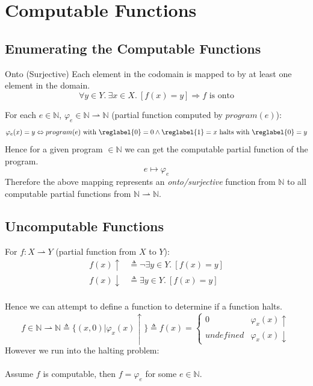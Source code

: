 \section{Computable Functions}
\subsection{Enumerating the Computable Functions}
\begin{definitionbox}{Onto (Surjective)}
    Each element in the codomain is mapped to by at least one element in the domain.
    \[\forall y \in Y. \  \exists x \in X. \  [f(x) = y] \Rightarrow f \text{ is onto}\]
\end{definitionbox}

For each $e \in \mathbb{N}$, $\varphi_e \in \mathbb{N} \rightharpoonup \mathbb{N}$ (partial function computed by $program(e)$):
\[\varphi_e(x) = y \Leftrightarrow program(e) \text{ with } \reglabel{0} = 0 \land \reglabel{1} = x \text{ halts with } \reglabel{0} = y\]
Hence for a given program $\in \mathbb{N}$ we can get the computable partial function of the program.
\[e \mapsto \varphi_e\]
Therefore the above mapping represents an \textit{onto/surjective} function from $\mathbb{N}$ to all computable partial functions from $\mathbb{N} \rightharpoonup \mathbb{N}$.

\subsection{Uncomputable Functions}
For $f: X \rightharpoonup Y$ (partial function from $X$ to $Y$):
\[\begin{split}
        f(x)\uparrow & \triangleq \neg \exists y \in Y . \ [f(x) = y] \\
        f(x)\downarrow & \triangleq  \exists y \in Y . \ [f(x) = y] \\
    \end{split}\]

Hence we can attempt to define a function to determine if a function halts.
\[f \in \mathbb{N} \rightharpoonup \mathbb{N} \triangleq \{(x,0) | \varphi_x(x)\uparrow\} \triangleq f(x) = \begin{cases}
		0         & \varphi_x(x)\uparrow   \\
		undefined & \varphi_x(x)\downarrow
	\end{cases}\]
However we run into the halting problem:
\\
\\ Assume $f$ is computable, then $f = \varphi_e$ for some $e \in \mathbb{N}$.

